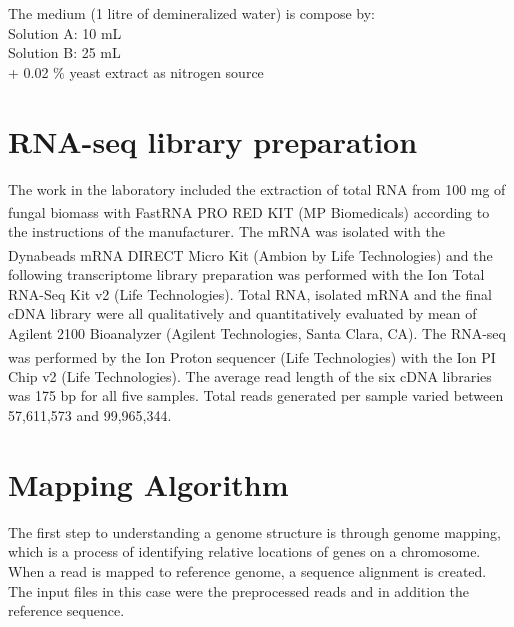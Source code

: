 \documentclass[12pt, a4paper]{report}
\begin{document}
The medium (1 litre of demineralized water) is compose by: \\
Solution A: 10 mL \\
Solution B: 25 mL \\
+ 0.02 $\%$ yeast extract as nitrogen source

\section{RNA-seq library preparation}
The work in the laboratory included the extraction of total RNA from 100 mg of fungal biomass with FastRNA PRO\textsuperscript{\texttrademark} RED KIT (MP Biomedicals) according to the instructions of the manufacturer. The mRNA was isolated with the Dynabeads\textsuperscript{\textregistered} mRNA DIRECT\textsuperscript{\texttrademark} Micro Kit (Ambion by Life Technologies) and the following transcriptome library preparation was performed with the Ion Total RNA-Seq Kit v2 (Life Technologies). 
Total RNA, isolated mRNA and the final cDNA library were all qualitatively and quantitatively evaluated by mean of Agilent 2100 Bioanalyzer (Agilent Technologies, Santa Clara, CA). The RNA-seq was performed by the Ion Proton\textsuperscript{\texttrademark} sequencer (Life Technologies) with the Ion PI Chip v2 (Life Technologies). 
The average read length of the six cDNA libraries was 175 bp for all five samples. Total reads generated per sample varied between 57,611,573 and 99,965,344. 

\section{Mapping Algorithm}\label{STAR}
The first step to understanding a genome structure is through genome mapping, which is a process of identifying relative locations of genes on a chromosome. When a read is mapped to reference genome, a sequence alignment is created. \cite{Xiong2006} The input files in this case were the preprocessed reads and in addition the reference sequence. \\
\end{document}
